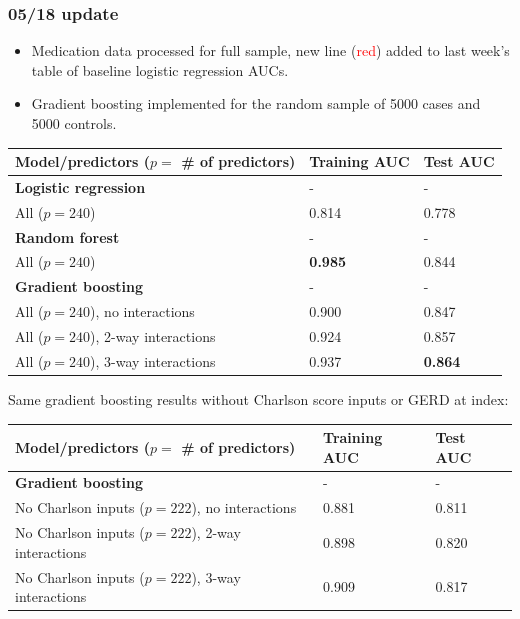 \documentclass[12pt]{article}
\newcommand{\note}[1]{\textcolor{red}{#1}}
\begin{document}
\pagebreak

\subsubsection*{05/18 update}

\begin{itemize}
  \item Medication data processed for full sample, new line (\note{red}) added to last week's table of baseline logistic regression AUCs.
  \item Gradient boosting implemented for the random sample of 5000 cases and 5000 controls.
\end{itemize}
\begin{center}
\begin{tabular}{|l|l|l|}
\hline
\textbf{Model/predictors ($p=$ \# of predictors)} & \textbf{Training AUC} & \textbf{Test AUC} \\ \hline
{\bf Logistic regression} & - & - \\ \hline
All ($p=240$) & 0.814 & 0.778 \\ \hline
{\bf Random forest} & - & - \\ \hline
All ($p=240$) & {\bf 0.985} & 0.844 \\ \hline
{\bf Gradient boosting} & - & - \\ \hline
All ($p=240$), no interactions & 0.900 & 0.847 \\ \hline
All ($p=240$), 2-way interactions & 0.924 & 0.857 \\ \hline
All ($p=240$), 3-way interactions & 0.937 & {\bf 0.864} \\ \hline
\end{tabular}
\end{center}
Same gradient boosting results without Charlson score inputs or GERD at index:
\begin{center}
\begin{tabular}{|l|l|l|}
\hline
\textbf{Model/predictors ($p=$ \# of predictors)} & \textbf{Training AUC} & \textbf{Test AUC} \\ \hline
{\bf Gradient boosting} & - & - \\ \hline
No Charlson inputs ($p=222$), no interactions & 0.881 & 0.811 \\ \hline
No Charlson inputs ($p=222$), 2-way interactions & 0.898 & 0.820 \\ \hline
No Charlson inputs ($p=222$), 3-way interactions & 0.909 & 0.817 \\ \hline
\end{tabular}
\end{center}
\end{document}
